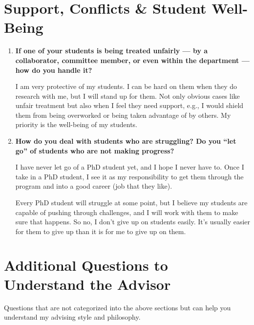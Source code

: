 \documentclass{article}
\begin{document}
\section{Support, Conflicts \& Student Well-Being}

\begin{enumerate}[label=\arabic*.]
    \item \textbf{If one of your students is being treated unfairly — by a collaborator, committee member, or even within the department — how do you handle it?}  
    
    I am very protective of my students. I can be hard on them when they do research with me, but I will stand up for them. Not only obvious cases like unfair treatment but also when I feel they need support, e.g., I would shield them from being overworked or being taken advantage of by others. My priority is the well-being of my students.

    \item \textbf{How do you deal with students who are struggling? Do you ``let go'' of students who are not making progress?}  
    
    I have never let go of a PhD student yet, and I hope I never have to. Once I take in a PhD student, I see it as my responsibility to get them through the program and into a good career (job that they like).  
    
    Every PhD student will struggle at some point, but I believe my students are capable of pushing through challenges, and I will work with them to make sure that happens. So no, I don't give up on students easily. It's usually easier for them to give up than it is for me to give up on them.
\end{enumerate}


\section{Additional Questions to Understand the Advisor}

Questions that are not categorized into the above sections but can help you understand my advising style and philosophy.
\end{document}
